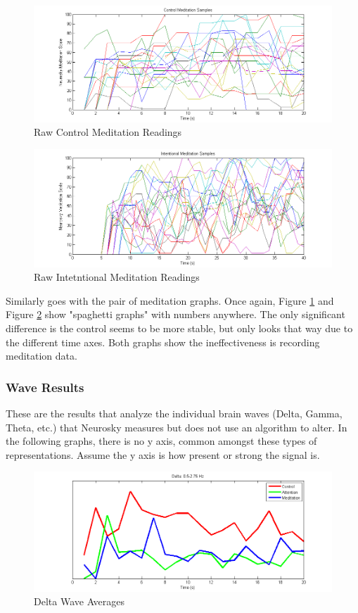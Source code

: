 \documentclass[journal]{IEEEtran}
\begin{document}
\begin{figure}[H]
    \centering
    \includegraphics[width=.5\textwidth]{EEG/all_meditations_control}
    \caption{Raw Control Meditation Readings}
    \label{a_m_c}
\end{figure} 

\begin{figure}[H]
    \centering
    \includegraphics[width=.5\textwidth]{EEG/all_meditations_intentional}
    \caption{Raw Intetntional Meditation Readings}
    \label{a_m_i}
\end{figure}


Similarly goes with the pair of meditation graphs. Once again, Figure \ref{a_m_c} and Figure \ref{a_m_i} show "spaghetti graphs" with numbers anywhere. The only significant difference is the control seems to be more stable, but only looks that way due to the different time axes. Both graphs show the ineffectiveness is recording meditation data. \par

\vspace{5mm}

\subsubsection{Wave Results}
These are the results that analyze the individual brain waves (Delta, Gamma, Theta, etc.) that Neurosky measures but does not use an algorithm to alter. In the following graphs, there is no y axis, common amongst these types of representations. Assume the y axis is how present or strong the signal is. \par

\begin{figure}[H]
    \centering
    \includegraphics[width=.5\textwidth]{EEG/wave1}
    \caption{Delta Wave Averages}
    \label{w1}
\end{figure}
\end{document}
